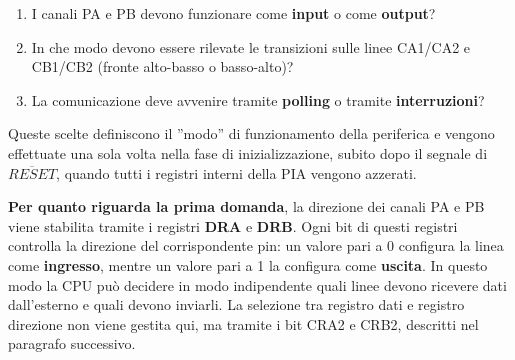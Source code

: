 \begin{enumerate}
    \item I canali PA e PB devono funzionare come \textbf{input} o come \textbf{output}?
    \item In che modo devono essere rilevate le transizioni sulle linee CA1/CA2 e CB1/CB2 
          (fronte alto-basso o basso-alto)?
    \item La comunicazione deve avvenire tramite \textbf{polling} o tramite \textbf{interruzioni}?
\end{enumerate}

Queste scelte definiscono il ''modo'' di funzionamento della periferica e vengono effettuate una sola 
volta nella fase di inizializzazione, subito dopo il segnale di \(\overline{RESET}\), quando tutti i 
registri interni della PIA vengono azzerati.

\medskip

\textbf{Per quanto riguarda la prima domanda}, la direzione dei canali PA e PB viene stabilita tramite 
i registri \textbf{DRA} e \textbf{DRB}. Ogni bit di questi registri controlla la direzione del 
corrispondente pin: un valore pari a 0 configura la linea come \textbf{ingresso}, mentre un valore pari 
a 1 la configura come \textbf{uscita}. In questo modo la CPU può decidere in modo indipendente quali 
linee devono ricevere dati dall’esterno e quali devono inviarli. La selezione tra registro dati e 
registro direzione non viene gestita qui, ma tramite i bit CRA2 e CRB2, descritti nel paragrafo 
successivo.


\medskip

